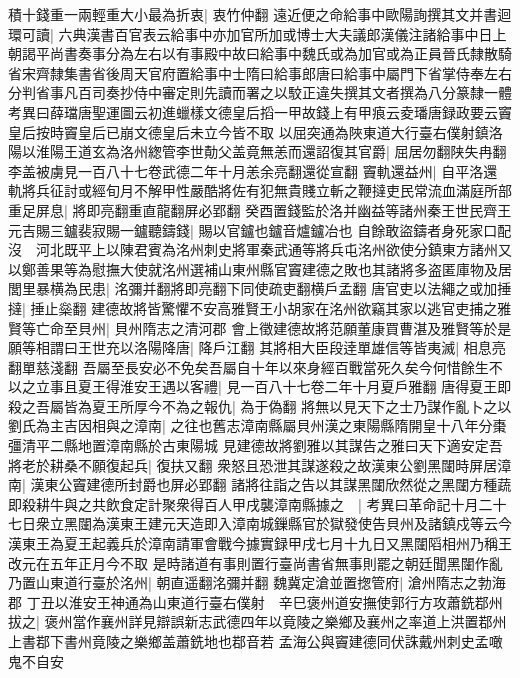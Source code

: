 積十錢重一兩輕重大小最為折衷|{
	衷竹仲翻}
遠近便之命給事中歐陽詢撰其文并書迴環可讀|{
	六典漢書百官表云給事中亦加官所加或博士大夫議郎漢儀注諸給事中日上朝謁平尚書奏事分為左右以有事殿中故曰給事中魏氏或為加官或為正員晉氏隸散騎省宋齊隸集書省後周天官府置給事中士隋曰給事郎唐曰給事中屬門下省掌侍奉左右分判省事凡百司奏抄侍中審定則先讀而署之以駮正違失撰其文者撰為八分篆隸一體　考異曰薛璫唐聖運圖云初進蠟樣文德皇后搯一甲故錢上有甲㾗云夌璠唐録政要云竇皇后按時竇皇后已崩文德皇后未立今皆不取}
以屈突通為陜東道大行臺右僕射鎮洛陽以淮陽王道玄為洛州緫管李世勣父盖竟無恙而還詔復其官爵|{
	屈居勿翻陕失冉翻李盖被虜見一百八十七卷武德二年十月恙余亮翻還從宣翻}
竇軌還益州|{
	自平洛還}
軌將兵征討或經旬月不解甲性嚴酷將佐有犯無貴賤立斬之鞭撻吏民常流血滿庭所部重足屏息|{
	將即亮翻重直龍翻屏必郢翻}
癸酉置錢監於洛并幽益等諸州秦王世民齊王元吉賜三鑪裴寂賜一鑪聽鑄錢|{
	賜以官鑪也鑪音爐鑪冶也}
自餘敢盜鑄者身死家口配沒　河北既平上以陳君賓為洺州刺史將軍秦武通等將兵屯洺州欲使分鎮東方諸州又以鄭善果等為慰撫大使就洺州選補山東州縣官竇建德之敗也其諸將多盗匿庫物及居閭里暴横為民患|{
	洺彌并翻將即亮翻下同使疏吏翻横戶孟翻}
唐官吏以法繩之或加捶撻|{
	捶止橤翻}
建德故將皆驚懼不安高雅賢王小胡家在洺州欲竊其家以逃官吏捕之雅賢等亡命至貝州|{
	貝州隋志之清河郡}
會上徵建德故將范願董康買曹湛及雅賢等於是願等相謂曰王世充以洛陽降唐|{
	降戶江翻}
其將相大臣段逹單雄信等皆夷滅|{
	相息亮翻單慈淺翻}
吾屬至長安必不免矣吾屬自十年以來身經百戰當死久矣今何惜餘生不以之立事且夏王得淮安王遇以客禮|{
	見一百八十七卷二年十月夏戶雅翻}
唐得夏王即殺之吾屬皆為夏王所厚今不為之報仇|{
	為于偽翻}
將無以見天下之士乃謀作亂卜之以劉氏為主吉因相與之漳南|{
	之往也舊志漳南縣屬貝州漢之東陽縣隋開皇十八年分棗彊清平二縣地置漳南縣於古東陽城}
見建德故將劉雅以其謀告之雅曰天下適安定吾將老於耕桑不願復起兵|{
	復扶又翻}
衆怒且恐泄其謀遂殺之故漢東公劉黑闥時屏居漳南|{
	漢東公竇建德所封爵也屏必郢翻}
諸將往詣之告以其謀黑闥欣然從之黑闥方種蔬即殺耕牛與之共飲食定計聚衆得百人甲戌襲漳南縣據之　|{
	考異曰革命記十月二十七日衆立黑闥為漢東王建元天造即入漳南城鏁縣官於獄發使告貝州及諸鎮戍等云今漢東王為夏王起義兵於漳南請軍會戰今據實録甲戌七月十九日又黑闥䧟相州乃稱王改元在五年正月今不取}
是時諸道有事則置行臺尚書省無事則罷之朝廷聞黑闥作亂乃置山東道行臺於洺州|{
	朝直遥翻洺彌并翻}
魏冀定滄並置揔管府|{
	滄州隋志之勃海郡}
丁丑以淮安王神通為山東道行臺右僕射　辛巳褒州道安撫使郭行方攻蕭銑鄀州拔之|{
	褒州當作襄州詳見辯誤新志武德四年以竟陵之樂鄉及襄州之率道上洪置鄀州上書鄀下書州竟陵之樂鄉盖蕭銑地也鄀音若}
孟海公與竇建德同伏誅戴州刺史孟噉鬼不自安

